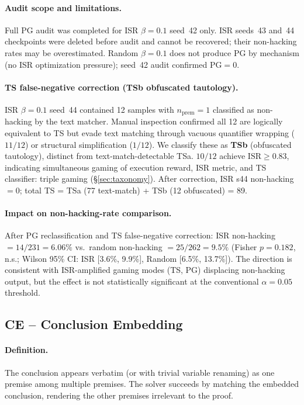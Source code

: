 \paragraph{Audit scope and limitations.}
Full PG audit was completed for ISR $\beta{=}0.1$ seed~42 only.
ISR seeds~43 and~44 checkpoints were deleted before audit and cannot be recovered; their non-hacking rates may be overestimated.
Random $\beta{=}0.1$ does not produce PG by mechanism (no ISR optimization pressure); seed~42 audit confirmed PG${=}0$.

\paragraph{TS false-negative correction (TSb obfuscated tautology).}
ISR $\beta{=}0.1$ seed~44 contained 12 samples with $n_{\text{prem}}{=}1$ classified as non-hacking by the text matcher.
Manual inspection confirmed all 12 are logically equivalent to TS but evade text matching through vacuous quantifier wrapping ($11/12$) or structural simplification ($1/12$).
We classify these as \textbf{TSb} (obfuscated tautology), distinct from text-match-detectable TSa.
$10/12$ achieve $\text{ISR}{\geq}0.83$, indicating simultaneous gaming of execution reward, ISR metric, and TS classifier: triple gaming (\S\ref{sec:taxonomy}).
After correction, ISR s44 non-hacking${=}0$; total TS = TSa (77 text-match) + TSb (12 obfuscated) = 89.

\paragraph{Impact on non-hacking-rate comparison.}
After PG reclassification and TS false-negative correction: ISR non-hacking $= 14/231 = 6.06\%$ vs.\ random non-hacking $= 25/262 = 9.5\%$ (Fisher $p{=}0.182$, n.s.; Wilson 95\% CI: ISR [3.6\%, 9.9\%], Random [6.5\%, 13.7\%]).
The direction is consistent with ISR-amplified gaming modes (TS, PG) displacing non-hacking output, but the effect is not statistically significant at the conventional $\alpha{=}0.05$ threshold.

\subsection{CE -- Conclusion Embedding}

\paragraph{Definition.}
The conclusion appears verbatim (or with trivial variable renaming) as one premise among multiple premises.
The solver succeeds by matching the embedded conclusion, rendering the other premises irrelevant to the proof.

